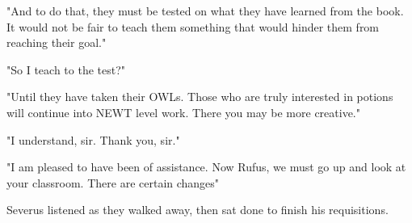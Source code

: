 "And to do that, they must be tested on what they have learned from the book. It would not be fair to teach them something that would hinder them from reaching their goal."

"So I teach to the test?"

"Until they have taken their OWLs. Those who are truly interested in potions will continue into NEWT level work. There you may be more creative."

"I understand, sir. Thank you, sir."

"I am pleased to have been of assistance. Now Rufus, we must go up and look at your classroom. There are certain changes{\el}"

Severus listened as they walked away, then sat done to finish his requisitions.


